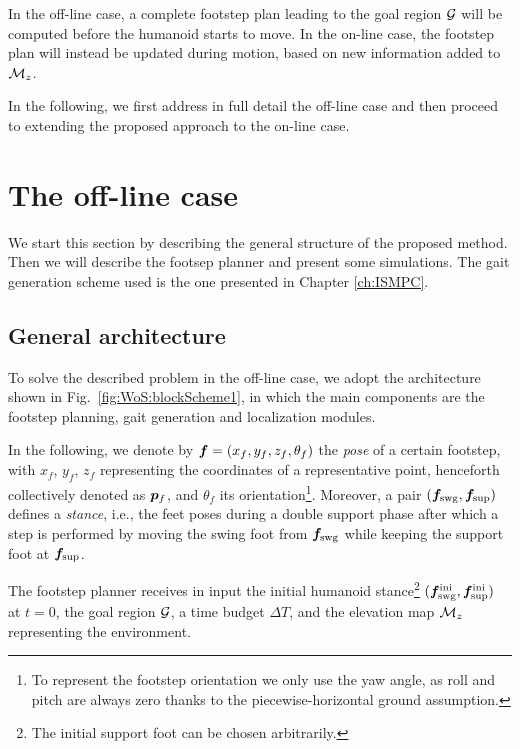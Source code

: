 In the off-line case, a complete footstep plan leading to the goal region $\cal G$ will be computed before the humanoid starts to move. In the on-line case, the footstep plan will instead be updated during motion, based on new information added to ${\cal M}_{z}$. 

In the following, we first address in full detail the off-line case and then proceed to extending the proposed approach to the on-line case.

\section{The off-line case} 
\label{sec:WoS:offlineCase}
We start this section by describing the general structure of the proposed method. Then we will describe the footsep planner and present some simulations. The gait generation scheme used is the one presented in Chapter \ref{ch:ISMPC}.

\subsection{General architecture}
\label{sec:WoS:offlineCase:GeneralArchitecture}

To solve the described problem in the off-line case, we adopt the architecture shown in Fig.~\ref{fig:WoS:blockScheme1}, in which the main components are the footstep planning, gait generation and localization modules.

In the following, we denote by ${\bm{f}} = (x_{f}, y_{f}, z_{f}, \theta_{f})$ the {\em pose} of a certain footstep, with $x_{f}$, $y_{f}$, $z_{f}$ representing the coordinates of a representative point, henceforth collectively denoted as ${\bm{p}}_f$, and $\theta_{f}$ its orientation\footnote{To represent the footstep orientation we only use the yaw angle, as roll and pitch are always zero thanks to the piecewise-horizontal ground assumption.}.
Moreover, a pair $({\bm{f}}_{\rm swg}, {\bm{f}}_{\rm sup})$ defines a {\em stance}, i.e., the feet poses during a double support phase after which a step is performed by moving the swing foot from ${\bm{f}}_{\rm swg}$ while keeping the support foot at ${\bm{f}}_{\rm sup}$. 

The footstep planner receives in input the initial humanoid stance\footnote{The initial support foot can be chosen arbitrarily.} $({\bm{f}}_{\rm swg}^{\rm ini}, {\bm{f}}_{\rm sup}^{\rm ini})$ at $t=0$, the goal region $\cal G$, a time budget $\Delta T$, and the elevation map ${\cal M}_z$ representing the environment.

